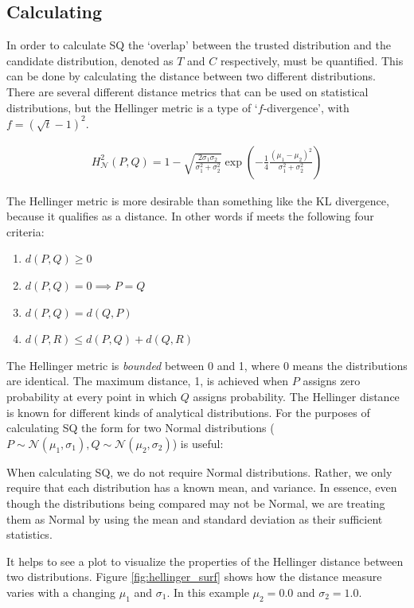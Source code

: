 \subsection{Calculating \xQ}
In order to calculate SQ the `overlap' between the trusted distribution and the candidate distribution, denoted as $T$ and $C$ respectively, must be quantified. This can be done by calculating the distance between two different distributions. There are several different distance metrics that can be used on statistical distributions, but the Hellinger metric is a type of `$f$-divergence', with $f=(\sqrt{t}-1)^2$.


\begin{align}
    H_{\mathcal{N}}^{2}(P,Q) = 1-\sqrt{\frac{2\sigma_1\sigma_2}{\sigma_1^2+\sigma_2^2}}\exp{\left(-\frac{1}{4}\frac{(\mu_1-\mu_2)^2}{\sigma_1^2+\sigma_2^2}\right)}
\end{align}

The Hellinger metric is more desirable than something like the KL divergence, because it qualifies as a distance. In other words if meets the following four criteria:

\begin{enumerate}
    \item $d(P,Q) \geq 0$
    \item $d(P,Q) = 0 \implies P=Q$
    \item $d(P,Q) = d(Q,P)$
    \item $d(P,R) \leq d(P,Q) + d(Q,R)$
\end{enumerate}

The Hellinger metric is \emph{bounded} between 0 and 1, where 0 means the distributions are identical. The maximum distance, 1, is achieved when $P$ assigns zero probability at every point in which $Q$ assigns probability. The Hellinger distance is known for different kinds of analytical distributions. For the purposes of calculating SQ the form for two Normal distributions ($P \sim \mathcal{N}(\mu_1,\sigma_1), Q\sim\mathcal{N}(\mu_2,\sigma_2)$) is useful:

When calculating SQ, we do not require Normal distributions. Rather, we only require that each distribution has a known mean, and variance. In essence, even though the distributions being compared may not be Normal, we are treating them as Normal by using the mean and standard deviation as their sufficient statistics.

It helps to see a plot to visualize the properties of the Hellinger distance between two distributions. Figure \ref{fig:hellinger_surf} shows how the distance measure varies with a changing $\mu_1$ and $\sigma_1$. In this example $\mu_2=0.0$ and $\sigma_2=1.0$.

